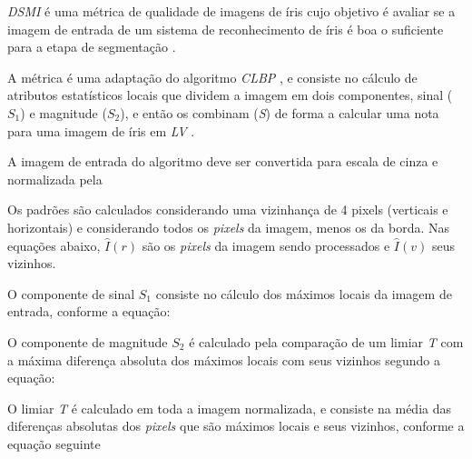 \par \textit{\acrfull{DSMI}} é uma métrica de qualidade de imagens de íris cujo objetivo é avaliar se a imagem de entrada de um sistema de reconhecimento de íris é boa o suficiente para a etapa de segmentação \cite{Jenadeleh_2018_CVPR_Workshops}. 

\par A métrica é uma adaptação do algoritmo \textit{\acrfull{CLBP}} \cite{guo2010-CLBP}, e consiste no cálculo de atributos estatísticos locais que dividem a imagem em dois componentes, sinal ($S_{1}$) e magnitude ($S_{2}$), e então os combinam (\textit{S}) de forma a calcular uma nota para uma imagem de íris em \textit{\acrfull{LV}} \cite{Jenadeleh_2018_CVPR_Workshops}.

\par A imagem de entrada do algoritmo deve ser convertida para escala de cinza e normalizada pela 


\par Os padrões são calculados considerando uma vizinhança de 4 pixels (verticais e horizontais) e considerando todos os \textit{pixels} da imagem, menos os da borda. Nas equações abaixo, $\widehat{I}(r)$ são os \textit{pixels} da imagem sendo processados e $\widehat{I}(v)$ seus vizinhos.

\par O componente de sinal $S_{1}$ consiste no cálculo dos máximos locais da imagem de entrada, conforme a equação:


\par O componente de magnitude $S_{2}$ é calculado pela comparação de um limiar \textit{T} com a máxima diferença absoluta dos máximos locais com seus vizinhos segundo a equação:


\noindent O limiar \textit{T} é calculado em toda a imagem normalizada, e consiste na média das diferenças absolutas dos \textit{pixels} que são máximos locais e seus vizinhos, conforme a equação seguinte

